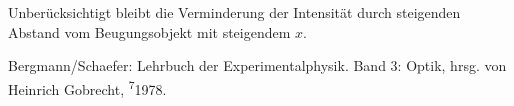 \documentclass{scrartcl}
\begin{document}
Unberücksichtigt bleibt die Verminderung der Intensität durch steigenden Abstand vom Beugungsobjekt mit steigendem $x$.

\begin{thebibliography}{9}
 Bergmann/Schaefer: Lehrbuch der Experimentalphysik. Band 3: Optik, hrsg. von Heinrich Gobrecht, \textsuperscript{7}1978.
\end{thebibliography}
\end{document}
